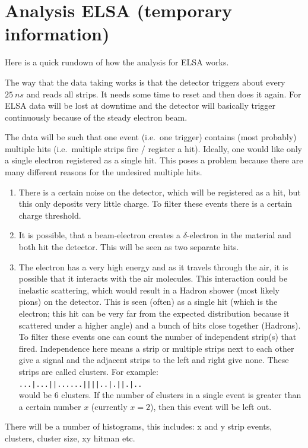 \documentclass[sn-mathphys-num,iicol]{sn-jnl}
\theoremstyle{thmstyleone}
\theoremstyle{thmstyletwo}
\theoremstyle{thmstylethree}
\begin{document}

\clearpage
\section{Analysis ELSA (\textbf{temporary information})}
Here is a quick rundown of how the analysis for ELSA works.

The way that the data taking works is that the detector triggers about every $\SI{25}{ns}$ and reads all strips.
It needs some time to reset and then does it again.
For ELSA data will be lost at downtime and the detector will basically trigger continuously because of the steady electron beam.

The data will be such that one event (i.e.\ one trigger) contains (most probably) multiple hits (i.e.\ multiple strips fire / register a hit).
Ideally, one would like only a single electron registered as a single hit.
This poses a problem because there are many different reasons for the undesired multiple hits.
\begin{enumerate}[label=\arabic*)]
  \item There is a certain noise on the detector, which will be registered as a hit, but this only deposits very little charge.
    To filter these events there is a certain charge threshold.
  \item It is possible, that a beam-electron creates a $\delta $-electron in the material and both hit the detector.
    This will be seen as two separate hits.
  \item The electron has a very high energy and as it travels through the air, it is possible that it interacts with the air molecules.
    This interaction could be inelastic scattering, which would result in a Hadron shower (most likely pions) on the detector.
    This is seen (often) as a single hit (which is the electron; this hit can be very far from the expected distribution because it scattered under a higher angle) and a bunch of hits close together (Hadrons).
    To filter these events one can count the number of independent strip(s) that fired.
    Independence here means a strip or multiple strips next to each other give a signal and the adjacent strips to the left and right give none.
    These strips are called clusters.
    For example: \\\texttt{...|...||......||||..|.||.|..}\\
    would be 6 clusters.
    If the number of clusters in a single event is greater than a certain number $x$ (currently $x=2$), then this event will be left out.
\end{enumerate}
There will be a number of histograms, this includes: x and y strip events, clusters, cluster size, xy hitman etc.\
\end{document}
